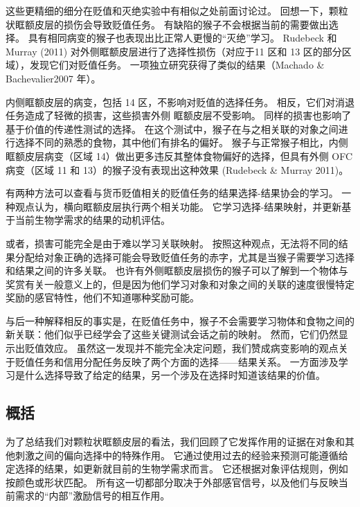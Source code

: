 这些更精细的细分在贬值和灭绝实验中有相似之处前面讨论过。
回想一下，颗粒状眶额皮层的损伤会导致贬值任务。
有缺陷的猴子不会根据当前的需要做出选择。
具有相同病变的猴子也表现出比正常人更慢的“灭绝”学习。
Rudebeck 和 Murray (2011) 对外侧眶额皮层进行了选择性损伤（对应于11 区和 13 区的部分区域），发现它们对贬值任务。
一项独立研究获得了类似的结果（Machado \& Bachevalier2007 年）。\par


内侧眶额皮层的病变，包括 14 区，不影响对贬值的选择任务。
相反，它们对消退任务造成了轻微的损害，这些损害外侧 眶额皮层不受影响。
同样的损害也影响了基于价值的传递性测试的选择。
在这个测试中，猴子在与之相关联的对象之间进行选择不同的熟悉的食物，其中他们有排名的偏好。
猴子与正常猴子相比，内侧眶额皮层病变（区域 14）做出更多违反其整体食物偏好的选择，但具有外侧 OFC 病变（区域 11 和 13）的猴子没有表现出这种效果 (Rudebeck \& Murray 2011)。\par


有两种方法可以查看与货币贬值相关的贬值任务的结果选择-结果协会的学习。
一种观点认为，横向眶额皮层执行两个相关功能。
它学习选择-结果映射，并更新基于当前生物学需求的结果的动机评估。\par


或者，损害可能完全是由于难以学习关联映射。
按照这种观点，无法将不同的结果分配给对象正确的选择可能会导致贬值任务的赤字，尤其是当猴子需要学习选择和结果之间的许多关联。
也许有外侧眶额皮层损伤的猴子可以了解到一个物体与奖赏有关一般意义上的，但是因为他们学习对象和对象之间的关联的速度很慢特定奖励的感官特性，他们不知道哪种奖励可能。\par


与后一种解释相反的事实是，在贬值任务中，猴子不会需要学习物体和食物之间的新关联：他们似乎已经学会了这些关键测试会话之前的映射。
然而，它们仍然显示出贬值效应。
虽然这一发现并不能完全决定问题，我们赞成病变影响的观点关于贬值任务和信用分配任务反映了两个方面的选择——结果关系。
一方面涉及学习是什么选择导致了给定的结果，另一个涉及在选择时知道该结果的价值。\par



\subsection{概括}

为了总结我们对颗粒状眶额皮层的看法，我们回顾了它发挥作用的证据在对象和其他刺激之间的偏向选择中的特殊作用。
它通过使用过去的经验来预测可能遵循给定选择的结果，如更新就目前的生物学需求而言。
它还根据对象评估规则，例如按颜色或形状匹配。
所有这一切都部分取决于外部感官信号，以及他们与反映当前需求的“内部”激励信号的相互作用。\par


